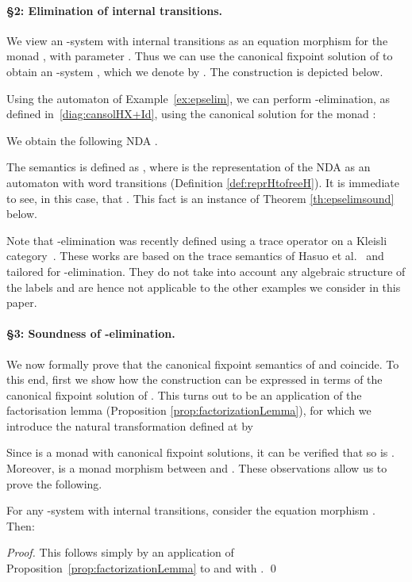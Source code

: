 \documentclass[oribibl,envcountsame,envcountsect,runningheads]{llncs}
\renewcommand{\>}{\rangle}
\begin{document}
\paragraph{\bf \S 2: Elimination of internal transitions.}
We view an -system  with internal transitions as an equation morphism for the monad , with parameter . Thus we can use the canonical fixpoint solution of  to obtain an -system , which we denote by . The construction is depicted below.

\begin{example}[-elimination]
Using the automaton of Example~\ref{ex:epselim}, we can perform -elimination, as defined in~\eqref{diag:cansolHX+Id}, using the canonical solution for the monad :

We obtain the following NDA .

The semantics  is defined as , where  is the representation of the NDA  as an automaton with word transitions (Definition \ref{def:reprHtofreeH}). It is immediate to see, in this case, that . This fact is an instance of Theorem \ref{th:epselimsound} below.
\end{example}
\begin{remark} Note that -elimination was recently defined using a trace operator on a Kleisli category~\cite{Hasuo06,SW13,Asada}. These works are based on the trace semantics of Hasuo et al.~\cite{HasuoJS:07} and tailored for -elimination. They do not take into account any algebraic structure of the labels and are hence not applicable to the other examples we consider in this paper. \end{remark}
\paragraph{\bf \S 3: Soundness of -elimination.}
We now formally prove that the canonical fixpoint semantics of  and  coincide. To this end, first we show how the construction  can be expressed in terms of the canonical fixpoint solution of . This turns out to be an application of the factorisation lemma (Proposition \ref{prop:factorizationLemma}), for which we introduce the natural transformation  defined at  by

Since  is a monad with canonical fixpoint solutions, it can be verified that so is . Moreover,  is a monad morphism between  and . These observations allow us to prove the following.

\newcommand{\propfactEpsilonElim}{ For any -system  with internal transitions, consider the equation morphism . Then:
}
\begin{proposition} \label{prop:factEpsilonElim}
\propfactEpsilonElim
\end{proposition}
\begin{proof}
  This follows simply by an application of Proposition~\ref{prop:factorizationLemma} to  and  with . \qed
\end{proof}
\end{document}
